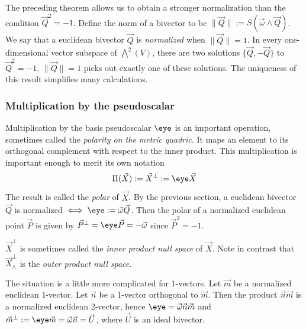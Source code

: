 \documentclass[12pt]{article}
\begin{document}
The preceding theorem allows us to obtain a stronger normalization than the condition $\vec{Q}^{2}=-1$.  Define the norm of a bivector to be $\| \vec{Q} \| := S(\vec{\omega} \wedge \vec{Q})$.  We say that a euclidean bivector $\vec{Q}$ is \emph{normalized} when $\| \vec{Q} \| = 1$.    In every one-dimensional vector subspace of $\bigwedge^{2}(V)$, there are two solutions $\{ \vec{Q}, -\vec{Q}\}$ to $\vec{Q}^{2}=-1$. $\| \vec{Q} \| = 1$ picks out exactly one of these solutions. The uniqueness of this result simplifies many calculations.

\subsubsection{Multiplication by the pseudoscalar}
 Multiplication by the basis pseudoscalar $\eye$ is an important operation, sometimes called the \emph{polarity on the metric quadric}. It maps an element to its orthogonal complement with respect to the inner product.  This multiplication is important enough to merit its own notation \[\Pi(\vec{X}) := \vec{X}^{\perp} := \eye \vec{X}\] The result is  called the  \emph{polar} of $\vec{X}$.  By the previous section,  a euclidean bivector $\vec{Q}$ is normalized $\iff  \eye := \vec{\omega} \vec{Q}$.  Then the polar of a normalized euclidean point $\vec{P}$ is given by $ \vec{P}^{\perp} =  \eye \vec{P} =  -\vec{\omega}$ since $\vec{P}^{2} = -1$.  
 
 $\vec{X}^\perp$ is sometimes called the \emph{inner product null space} of $\vec{X}$.  Note in contrast that $\vec{X}^\perp_{\wedge}$ is the \emph{outer product null space}.
 
 The situation is a little more complicated for 1-vectors. Let $\vec{m}$ be a normalized euclidean 1-vector.  Let $\vec{n}$ be a 1-vector orthogonal to $\vec{m}$. Then the product $\vec{n}\vec{m}$ is a normalized euclidean 2-vector, hence $\eye = \vec{\omega}\vec{n}\vec{m}$ and $\vec{m}^{\perp} := \eye \vec{m} = \vec{\omega} \vec{n} = \vec{U}$, where $\vec{U}$ is an ideal bivector.   
 
\end{document}
